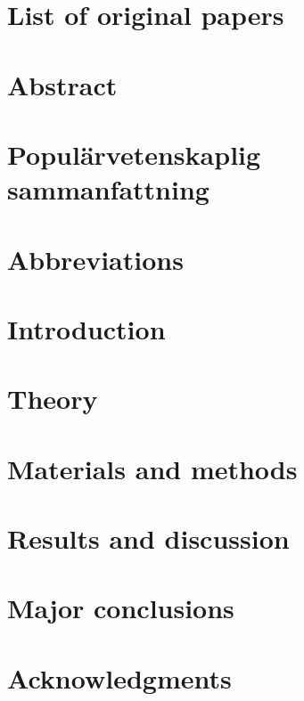 \documentclass{sephdthesis}
\begin{document}
\frontmatter \maketitle
\cleardoublepage
\tableofcontents\cleardoublepage
\chapter{List of original papers}
\cleardoublepage
\chapter{Abstract}
\cleardoublepage
\chapter{Populärvetenskaplig sammanfattning}
\cleardoublepage
\chapter{Abbreviations}
\cleardoublepage
\mainmatter%
\pagestyle{ruled}
\nouppercaseheads
\chapter{Introduction}
\cleardoublepage
\chapter{Theory}
\cleardoublepage
\chapter{Materials and methods}
\cleardoublepage
\chapter{Results and discussion}
\cleardoublepage
\chapter{Major conclusions}
\cleardoublepage
\backmatter
\chapter{Acknowledgments}
\cleardoublepage

\pagestyle{bib_style}



\end{document}
